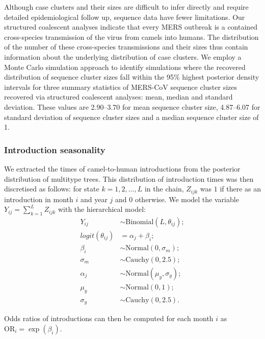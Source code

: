 \documentclass[11pt,oneside,letterpaper]{article}
\def\gdc#1{\textcolor{blue}{[#1]}}
\def\lmc#1{\textcolor{green}{[#1]}}
\begin{document}
Although case clusters and their sizes are difficult to infer directly and require detailed epidemiological follow up, sequence data have fewer limitations.%
Our structured coalescent analyses indicate that every MERS outbreak is a contained cross-species transmission of the virus from camels into humans.
The distribution of the number of these cross-species transmissions and their sizes thus contain information about the underlying distribution of case clusters.
We employ a Monte Carlo simulation approach to identify simulations where the recovered distribution of sequence cluster sizes fall within the 95\% highest posterior density intervals for three summary statistics of MERS-CoV sequence cluster sizes recovered via structured coalescent analyses: mean, median and standard deviation.
These values are 2.90--3.70 for mean sequence cluster size, 4.87--6.07 for standard deviation of sequence cluster sizes and a median sequence cluster size of 1.

\subsubsection*{Introduction seasonality}

We extracted the times of camel-to-human introductions from the posterior distribution of multitype trees.
This distribution of introduction times was then discretised as follows: for state  $k = 1, 2, \ldots, L$ in the chain,  $Z_{ijk}$ was $1$ if there as an introduction in month $i$ and year $j$ and $0$ otherwise.
We model the variable $Y_{ij} = \sum_{k = 1}^L Z_{ijk}$ with the hierarchical model:
\begin{align*}
  Y_{ij} &\sim \text{Binomial}(L, \theta_{ij}); \\
  logit(\theta_{ij}) &= \alpha_j + \beta_i; \\
  \beta_i &\sim \text{Normal}(0, \sigma_{m}); \\
  \sigma_{m} &\sim \text{Cauchy}(0, 2.5); \\
  \alpha_j &\sim \text{Normal}(\mu_{y}, \sigma_{y}); \\
  \mu_{y}  &\sim  \text{Normal}(0, 1); \\
  \sigma_{y} &\sim \text{Cauchy}(0, 2.5).
\end{align*}

Odds ratios of introductions can then be computed for each month $i$ as $\text{OR}_i = \exp(\beta_i)$.
\end{document}
